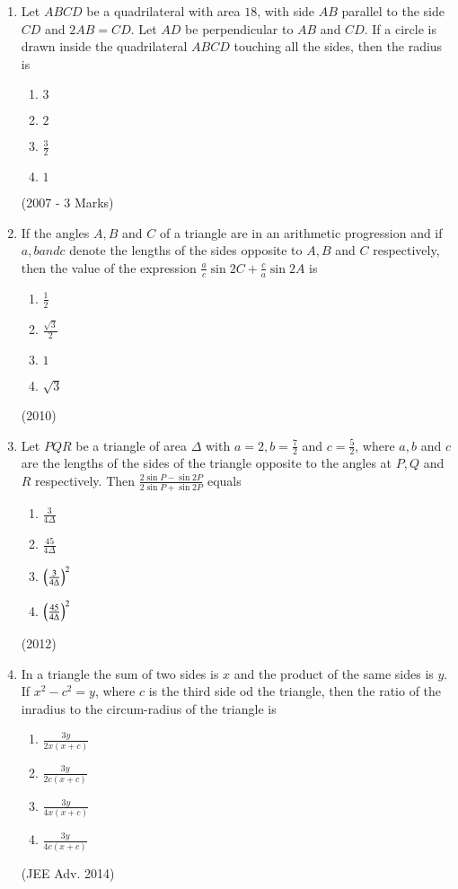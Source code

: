 \documentclass[journal,12pt,twocolumn]{IEEEtran}
\theoremstyle{remark}
\begin{document}
\begin{enumerate}
\item Let $ABCD$ be a quadrilateral with area $18$, with side $AB$ parallel to the side $CD$ and $2AB = CD$. Let $AD$ be perpendicular to $AB$ and $CD$. If a circle is drawn inside the quadrilateral $ABCD$ touching all the sides, then the radius is
\begin{enumerate}[label = (\alph*)]
\item $3$
\item $2$
\item $\frac{3}{2}$
\item $1$
\end{enumerate}
\hfill (2007 - 3 Marks)

\item If the angles $A, B$ and $C$ of a triangle are in an arithmetic progression and if $a, b and c$ denote the lengths of the sides opposite to $A, B$ and $C$ respectively, then the value of the expression $\frac{a}{c}\sin 2C + \frac{c}{a} \sin 2A$ is
\begin{enumerate}[label = (\alph*)]
\item $\frac{1}{2}$
\item $\frac{\sqrt{3}}{2}$
\item $1$
\item $\sqrt{3}$
\end{enumerate}
\hfill (2010)

\item Let $PQR$ be a triangle of area $\Delta$ with $a=2, b= \frac{7}{2}$ and $c=\frac{5}{2}$, where $a, b$ and $c$ are the lengths of the sides of the triangle opposite to the angles at $P, Q$ and $R$ respectively. Then $\frac{2\sin P - \sin 2P}{2\sin P + \sin 2P}$ equals
\begin{enumerate}[label = (\alph*)]
\item $\frac{3}{4\Delta}$
\item $\frac{45}{4\Delta}$
\item $\left(\frac{3}{4\Delta}\right)^2$
\item $\left(\frac{45}{4\Delta}\right)^2$
\end{enumerate}
\hfill (2012)

\item In a triangle the sum of two sides is $x$ and the product of the same sides is $y$. If $x^2-c^2=y$, where $c$ is the third side od the triangle, then the ratio of the inradius to the circum-radius of the triangle is
\begin{enumerate}[label = (\alph*)]
\item $\frac{3y}{2x(x+c)}$
\item $\frac{3y}{2c(x+c)}$
\item $\frac{3y}{4x(x+c)}$
\item $\frac{3y}{4c(x+c)}$
\end{enumerate}
\hfill (JEE Adv. 2014)

\end{enumerate}
\end{document}
